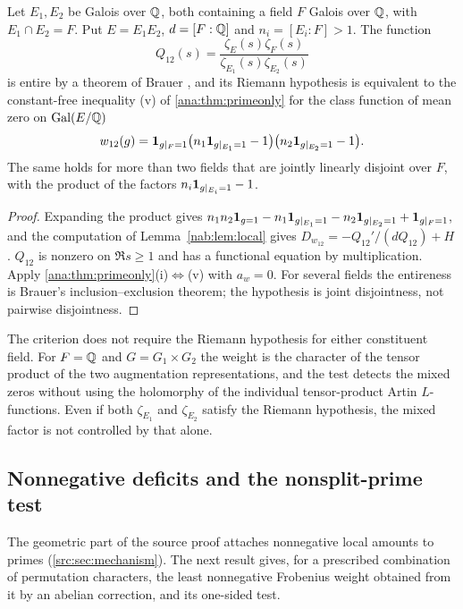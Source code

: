 \begin{proposition}\label{nab:prop:composita}
Let $E_1,E_2$ be Galois over $\mathbb{Q}$, both containing a field $F$ Galois over $\mathbb{Q}$, with
$E_1\cap E_2=F$. Put $E=E_1E_2$, $d=[F:\mathbb{Q}]$ and $n_i=[E_i:F]>1$. The function
\[
 Q_{12}(s)=\frac{\zeta_E(s)\zeta_F(s)}{\zeta_{E_1}(s)\zeta_{E_2}(s)}
\]
is entire by a theorem of Brauer \cite{Brauer1973Note}, and its Riemann hypothesis is
equivalent to the constant-free inequality \textup{(v)} of \cref{ana:thm:primeonly} for the
class function of mean zero
on $\operatorname{Gal}(E/\mathbb{Q})$
\[
 w_{12}(g)=\mathbf{1}_{g|_F=1}\bigl(n_1\mathbf{1}_{g|_{E_1}=1}-1\bigr)\bigl(n_2\mathbf{1}_{g|_{E_2}=1}-1\bigr).
\]
The same holds for more than two fields that are jointly linearly disjoint over $F$, with
the product of the factors $n_i\mathbf{1}_{g|_{E_i}=1}-1$.
\end{proposition}
\begin{proof}
Expanding the product gives
$n_1n_2\mathbf{1}_{g=1}-n_1\mathbf{1}_{g|_{E_1}=1}-n_2\mathbf{1}_{g|_{E_2}=1}+\mathbf{1}_{g|_F=1}$,
and the computation of Lemma~\ref{nab:lem:local} gives $D_{w_{12}}=-Q_{12}'/(dQ_{12})+H$.
$Q_{12}$ is nonzero on $\Re s\ge1$ and has a functional equation by multiplication. Apply
\cref{ana:thm:primeonly}\textup{(i)}$\Leftrightarrow$\textup{(v)} with $a_w=0$. For several fields the entireness is Brauer's
inclusion--exclusion theorem; the hypothesis is joint disjointness, not pairwise
disjointness.
\end{proof}

The criterion does not require the Riemann hypothesis for either constituent field. For
$F=\mathbb{Q}$ and $G=G_1\times G_2$ the weight is the character of the tensor product of the two
augmentation representations, and the test detects the mixed zeros without using the
holomorphy of the individual tensor-product Artin $L$-functions. Even if both $\zeta_{E_1}$
and $\zeta_{E_2}$ satisfy the Riemann hypothesis, the mixed factor is not controlled by
that alone.

\subsection{Nonnegative deficits and the nonsplit-prime test}\label{nab:sec:deficit}
\begingroup\raggedright
{}
\endgroup

The geometric part of the source proof attaches nonnegative local amounts to primes
(\cref{src:sec:mechanism}). The next result gives, for a prescribed combination of
permutation characters, the least nonnegative Frobenius weight obtained from it by an
abelian correction, and its one-sided test.

